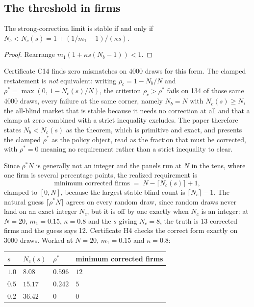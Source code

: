 \subsection{The threshold in firms}

\begin{aproposition}
\label{aprop:Nc}
The strong-correction limit is stable if and only if $N_b < N_c(s) = 1 + (1/m_1 - 1)/(\kappa s)$.
\end{aproposition}

\begin{proof}
Rearrange $m_1(1+\kappa s(N_b-1)) < 1$.
\end{proof}

Certificate C14 finds zero mismatches on 4000 draws for this form. The clamped restatement is \emph{not} equivalent: writing $\rho_c = 1-N_b/N$ and $\rho^\ast = \max(0,\,1-N_c(s)/N)$, the criterion $\rho_c > \rho^\ast$ fails on 134 of those same 4000 draws, every failure at the same corner, namely $N_b = N$ with $N_c(s) \geq N$, the all-blind market that is stable because it needs no correction at all and that a clamp at zero combined with a strict inequality excludes. The paper therefore states $N_b < N_c(s)$ as the theorem, which is primitive and exact, and presents the clamped $\rho^\ast$ as the policy object, read as the fraction that must be corrected, with $\rho^\ast = 0$ meaning no requirement rather than a strict inequality to clear.

Since $\rho^\ast N$ is generally not an integer and the panels run at $N$ in the tens, where one firm is several percentage points, the realized requirement is
\[
  \text{minimum corrected firms} \;=\; N - \lceil N_c(s)\rceil + 1,
\]
clamped to $[0,N]$, because the largest stable blind count is $\lceil N_c\rceil - 1$. The natural guess $\lceil \rho^\ast N\rceil$ agrees on every random draw, since random draws never land on an exact integer $N_c$, but it is off by one exactly when $N_c$ is an integer: at $N=20$, $m_1=0.15$, $\kappa=0.8$ and the $s$ giving $N_c=8$, the truth is 13 corrected firms and the guess says 12. Certificate H4 checks the correct form exactly on 3000 draws. Worked at $N=20$, $m_1=0.15$ and $\kappa=0.8$:

\begin{center}
\small
\begin{tabular}{llll}
\toprule
$s$ & $N_c(s)$ & $\rho^\ast$ & minimum corrected firms \\
\midrule
$1.0$ & $8.08$ & $0.596$ & $12$ \\
$0.5$ & $15.17$ & $0.242$ & $5$ \\
$0.2$ & $36.42$ & $0$ & $0$ \\
\bottomrule
\end{tabular}
\end{center}

